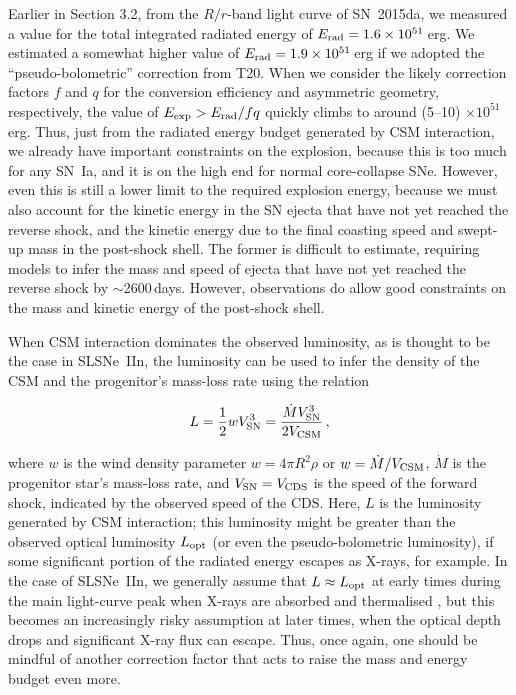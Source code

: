 \documentclass[fleqn,usenatbib,useAMS]{mnras}
\begin{document}
Earlier in Section 3.2, from the $R/r$-band light curve of SN~2015da,
we measured a value for the total integrated radiated energy of
$E_{\rm rad} = 1.6 \times 10^{51}$\,erg.  We estimated a somewhat
higher value of $E_{\rm rad} = 1.9 \times 10^{51}$\,erg if we adopted
the ``pseudo-bolometric'' correction from T20.  When we consider the
likely correction factors $f$ and $q$ for the conversion efficiency
and asymmetric geometry, respectively, the value of $E_{\rm exp} >
E_{\rm rad}/fq$ quickly climbs to around
(5--10) $\times 10^{51}$\,erg.  Thus, just from the radiated energy
budget generated by CSM interaction, we already have important
constraints on the explosion, because this is too much for any SN~Ia,
and it is on the high end for normal core-collapse SNe.  However, even this
is still a lower limit to the required explosion energy, because we
must also account for the kinetic energy in the SN ejecta that have
not yet reached the reverse shock, and the kinetic energy due to the
final coasting speed and swept-up mass in the post-shock shell.  The
former is difficult to estimate, requiring models to infer
the mass and speed of ejecta that have not yet reached the reverse
shock by $\sim$2600\,days.  However, observations do allow good
constraints on the mass and kinetic energy of the post-shock shell.

When CSM interaction dominates the observed luminosity, as is thought
to be the case in SLSNe~IIn, the luminosity can be used to infer the
density of the CSM and the progenitor's mass-loss rate using the
relation \cite[][]{smith17}

\begin{equation}
L = \frac{1}{2} w V_{\rm SN}^3 = \frac{\dot{M} V_{\rm SN}^3}{2 V_{\rm CSM}}\, ,
\end{equation}

\noindent where $w$ is the wind density parameter $w = 4 \pi R^2
\rho$ or $w = \dot{M} / V_{\rm CSM}$, $\dot{M}$ is the progenitor
star's mass-loss rate, and $V_{\rm SN} = V_{\rm CDS}$ is the speed of
the forward shock, indicated by the observed speed of the CDS.  Here, $L$ is the luminosity generated by CSM interaction;
this luminosity might be greater than the observed optical luminosity
$L_{\rm opt}$ (or even the pseudo-bolometric luminosity), if some
significant portion of the radiated energy escapes as X-rays, for
example.  In the case of SLSNe~IIn, we generally assume that $L
\approx L_{\rm opt}$ at early times during the main light-curve peak
when X-rays are absorbed and thermalised \citep{sm07}, but this
becomes an increasingly risky assumption at later times, when the
optical depth drops and significant X-ray flux can escape. Thus, once
again, one should be mindful of another correction factor that acts to
raise the mass and energy budget even more.
\end{document}
